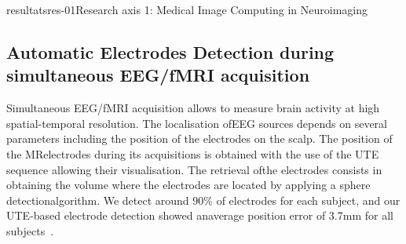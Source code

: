 \documentclass{ra2018}
\begin{document}
\begin{module}{resultats}{res-01}{Research axis 1: Medical Image Computing in Neuroimaging}
\subsection{Automatic Electrodes Detection during simultaneous EEG/fMRI acquisition}
\begin{participants}
\end{participants}
Simultaneous EEG/fMRI acquisition allows to measure brain activity at high spatial-temporal resolution. The localisation ofEEG sources depends on several parameters including the position of the electrodes on the scalp. The position of the MRelectrodes during its acquisitions is obtained with the use of the UTE sequence allowing their visualisation. The retrieval ofthe electrodes consists in obtaining the volume where the electrodes are located by applying a sphere detectionalgorithm. We detect around 90\% of electrodes for each subject, and our UTE-based electrode detection showed anaverage position error of 3.7mm for all subjects~\cite{fleury:hal-01874815}.


\end{module}
\end{document}
